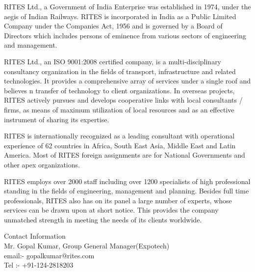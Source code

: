 
RITES Ltd., a Government of India Enterprise was established in 1974, under the aegis of Indian Railways. RITES is incorporated in India as a Public Limited Company under the Companies Act, 1956 and is governed by a Board of Directors which includes persons of eminence from various sectors of engineering and management.

RITES Ltd., an ISO 9001:2008 certified company, is a multi-disciplinary consultancy organization in the fields of transport, infrastructure and related technologies. It provides a comprehensive array of services under a single roof and believes n transfer of technology to client organizations. In overseas projects, RITES actively pursues and develops cooperative links with local consultants / firms, as means of maximum utilization of local resources and as an effective instrument of sharing its expertise.

RITES is internationally recognized as a leading consultant with operational experience of 62 countries in Africa, South East Asia, Middle East and Latin America. Most of RITES foreign assignments are for National Governments and other apex organizations.

RITES employs over 2000 staff including over 1200 specialists of high professional standing in the fields of engineering, management and planning. Besides full time professionals, RITES also has on its panel a large number of experts, whose services can be drawn upon at short notice. This provides the company unmatched strength in meeting the needs of its clients worldwide.
 
Contact Information\\

Mr. Gopal Kumar, Group General Manager(Expotech)\\
email:- gopalkumar@rites.com\\
Tel :- +91-124-2818203 \\

 